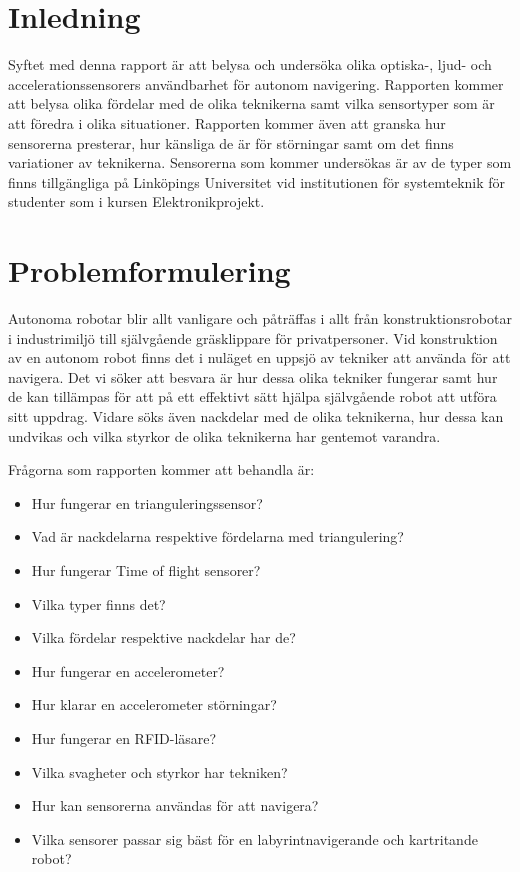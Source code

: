 \documentclass[a4paper,12pt,fleqn]{article}
\begin{document}
\addto\captionsswedish{\renewcommand{\contentsname}{Innehållsförteckning}}

\tableofcontents
\thispagestyle{fancy}
\newpage

\section{Inledning}
Syftet med denna rapport är att belysa och undersöka olika optiska-, ljud- och accelerationssensorers användbarhet för autonom navigering.
Rapporten kommer att belysa olika fördelar med de olika teknikerna samt vilka sensortyper som är att föredra i olika situationer.
Rapporten kommer även att granska hur sensorerna presterar, hur känsliga de är för störningar samt om det finns variationer av teknikerna.
Sensorerna som kommer undersökas är av de typer som finns tillgängliga på Linköpings Universitet vid institutionen för systemteknik för studenter som i kursen Elektronikprojekt.


\section{Problemformulering}
Autonoma robotar blir allt vanligare och påträffas i allt från konstruktionsrobotar i industrimiljö till självgående gräsklippare för privatpersoner.
Vid konstruktion av en autonom robot finns det i nuläget  en uppsjö av tekniker att använda för att navigera. Det vi söker att besvara är hur dessa olika tekniker fungerar samt hur de kan tillämpas för att på ett effektivt sätt hjälpa självgående robot att utföra sitt uppdrag.
Vidare söks även nackdelar med de olika teknikerna, hur dessa kan undvikas och vilka styrkor de olika teknikerna har gentemot varandra.

Frågorna som rapporten kommer att behandla är:
\begin{itemize}

\item Hur fungerar en trianguleringssensor? 
\item Vad är nackdelarna respektive fördelarna med triangulering?

\item Hur fungerar Time of flight sensorer?
\item Vilka typer finns det?
\item Vilka fördelar respektive nackdelar har de?

\item Hur fungerar en accelerometer? 
\item Hur klarar en accelerometer störningar?

\item Hur fungerar en RFID-läsare?
\item Vilka svagheter och styrkor har tekniken?

\item Hur kan sensorerna användas för att navigera?
\item Vilka sensorer passar sig bäst för en labyrintnavigerande och kartritande robot?
\end{itemize}
\end{document}
